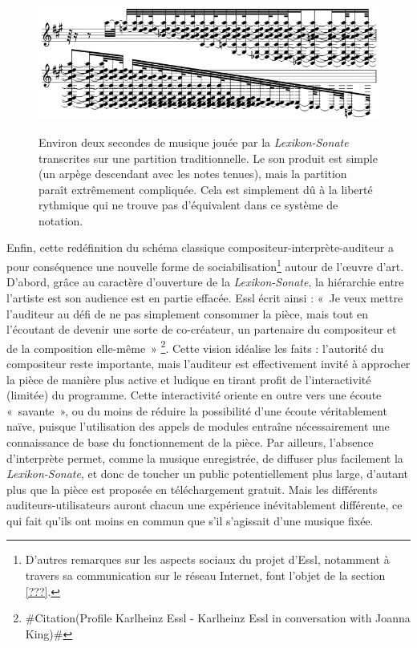 \documentclass[a4paper,12pt]{article}
\newcommand{\guill}[1]{«~#1~»}
\newcommand{\zitat}[2]{\#Citation(#2)\#}
\begin{document}
\begin{figure}[h!]
\begin{center}
\includegraphics[width=12cm]{images/partitionls.png}
\label{partitionls}
\caption{\footnotesize Environ deux secondes de musique jouée par la \emph{Lexikon-Sonate} transcrites sur une partition traditionnelle. Le son produit est simple (un arpège descendant avec les notes tenues), mais la partition paraît extrêmement compliquée. Cela est simplement dû à la liberté rythmique qui ne trouve pas d'équivalent dans ce système de notation.}
\end{center}
\end{figure}

Enfin, cette redéfinition du schéma classique compositeur-interprète-auditeur a pour conséquence une nouvelle forme de sociabilisation\footnote{D'autres remarques sur les aspects sociaux du projet d'Essl, notamment à travers sa communication sur le réseau Internet, font l'objet de la section \ref{???}.} autour de l'œuvre d'art. D'abord, grâce au caractère d'ouverture de la \emph{Lexikon-Sonate}, la hiérarchie entre l'artiste est son audience est en partie effacée. Essl écrit ainsi : \guill{Je veux mettre l'auditeur au défi de ne pas simplement consommer la pièce, mais tout en l'écoutant de devenir une sorte de co-créateur, un partenaire du compositeur et de la composition elle-même}
\footnote{\zitat{I want to challenge the listener not just to consume the piece but by listening becoming something like a co-creator, being a partner of the composer and the composition itself.}
{Profile Karlheinz Essl - Karlheinz Essl in conversation with Joanna King}}.
Cette vision idéalise les faits : l'autorité du compositeur reste importante, mais l'auditeur est effectivement invité à approcher la pièce de manière plus active et ludique en tirant profit de l'interactivité (limitée) du programme. Cette interactivité oriente en outre vers une écoute \guill{savante}, ou du moins de réduire la possibilité d'une écoute véritablement naïve, puisque l'utilisation des appels de modules entraîne nécessairement une connaissance de base du fonctionnement de la pièce. Par ailleurs, l'absence d'interprète permet, comme la musique enregistrée, de diffuser plus facilement la \emph{Lexikon-Sonate}, et donc de toucher un public potentiellement plus large, d'autant plus que la pièce est proposée en téléchargement gratuit. Mais les différents auditeurs-utilisateurs auront chacun une expérience inévitablement différente, ce qui fait qu'ils ont moins en commun que s'il s'agissait d'une musique fixée.
\end{document}
